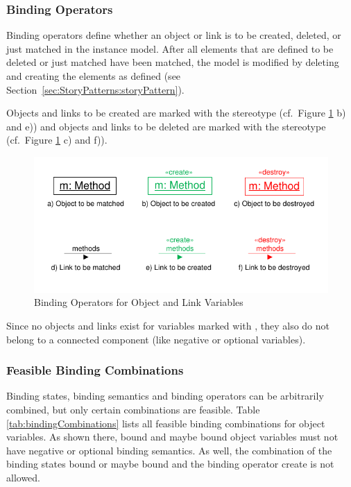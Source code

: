 \subsubsection{Binding Operators}
\label{sec:StoryPatterns:binding:operators}
Binding operators define whether an object or link is to be created, deleted,
or just matched in the instance model.
After all elements that are defined to be deleted or just matched have been
matched, the model is modified by deleting and creating the elements as
defined (see Section~\ref{sec:StoryPatterns:storyPattern}).

Objects and links to be created are marked with the
stereotype \create (cf.\ Figure \ref{fig:bindingOperatorsOverview} b) and e)) and objects and links
to be deleted are marked with the stereotype \destroy (cf.\ Figure
\ref{fig:bindingOperatorsOverview} c) and f)).

\begin{figure}[htbp]
  \centering
  \includegraphics[scale=1.2]{figures/BindingOperatorsOverview}
  \caption{Binding Operators for Object and Link Variables}
  \label{fig:bindingOperatorsOverview}
\end{figure}

Since no objects and links exist for variables marked with \create, they also do not belong to a connected component (like
negative or optional variables).


\subsubsection{Feasible Binding Combinations}

Binding states, binding semantics and binding operators can be
arbitrarily combined, but only certain combinations are feasible. 
Table \ref{tab:bindingCombinations} lists all feasible binding combinations for
object variables. As shown there, bound and maybe bound object variables must not have negative
or optional binding semantics. As well, the combination of the binding states
bound or maybe bound and the binding operator create is not allowed.

